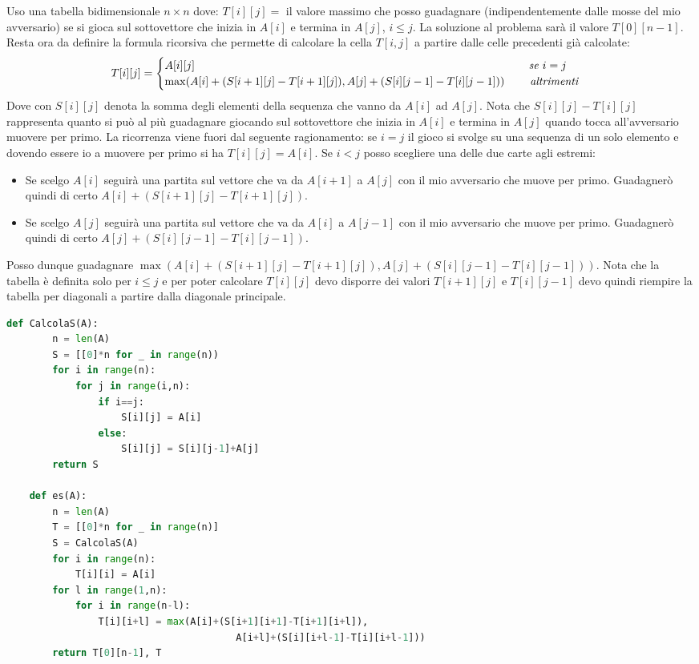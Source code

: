 Uso una tabella bidimensionale $n\times n$ dove: $T[i][j] =$ il valore massimo che posso guadagnare (indipendentemente dalle mosse del mio avversario) se si gioca sul sottovettore che inizia in $A[i]$ e termina in $A[j]$, $i\leq j$. La soluzione al problema sarà il valore $T[0][n-1]$. Resta ora da definire la formula ricorsiva che permette di calcolare la cella $T[i, j]$ a partire dalle celle precedenti già calcolate:
\begin{equation*}T[i][j]=
\begin{cases}
    A[i][j]\hspace{10.5cm}\textit{se }i=j\\
    \max(A[i]+(S[i+1][j]-T[i+1][j]), A[j]+(S[i][j-1]-T[i][j-1]))\hspace{.8cm}\textit{altrimenti}
\end{cases}
\end{equation*}
Dove con $S[i][j]$ denota la somma degli elementi della sequenza che vanno da $A[i]$ ad $A[j]$. Nota che $S[i][j]-T[i][j]$ rappresenta quanto si può al più guadagnare giocando sul sottovettore che inizia in $A[i]$ e termina in $A[j]$ quando tocca all'avversario muovere per primo. La ricorrenza viene fuori dal seguente ragionamento: se $i=j$ il gioco si svolge su una sequenza di un solo elemento e dovendo essere io a muovere per primo si ha $T[i][j]=A[i]$. Se $i < j$ posso scegliere una delle due carte agli estremi:
\begin{itemize}
    \item Se scelgo $A[i]$ seguirà una partita sul vettore che va da $A[i + 1]$ a $A[j]$ con il mio avversario che muove per primo. Guadagnerò quindi di certo $A[i]+(S[i + 1][j] - T[i + 1][j])$. 
    \item Se scelgo $A[j]$ seguirà una partita sul vettore che va da $A[i]$ a $A[j - 1]$ con il mio avversario che muove per primo. Guadagnerò quindi di certo $A[j]+(S[i][j - 1] - T[i][j - 1])$.
\end{itemize}
Posso dunque guadagnare $\max(A[i]+(S[i+1][j]-T[i+1][j]), A[j]+(S[i][j-1]-T[i][j-1]))$. Nota che la tabella è definita solo per $i \leq j$ e per poter calcolare $T[i][j]$ devo disporre dei valori $T[i + 1][j]$ e $T[i][j - 1]$ devo quindi riempire la tabella per diagonali a partire dalla diagonale principale.

\begin{lstlisting}[language=Python]
    def CalcolaS(A):
        n = len(A)
        S = [[0]*n for _ in range(n))
        for i in range(n):
            for j in range(i,n):
                if i==j:
                    S[i][j] = A[i]
                else:
                    S[i][j] = S[i][j-1]+A[j]
        return S

    def es(A):
        n = len(A)
        T = [[0]*n for _ in range(n)]
        S = CalcolaS(A)
        for i in range(n):
            T[i][i] = A[i]
        for l in range(1,n):
            for i in range(n-l):
                T[i][i+l] = max(A[i]+(S[i+1][i+1]-T[i+1][i+l]), 
                                        A[i+l]+(S[i][i+l-1]-T[i][i+l-1]))
        return T[0][n-1], T
\end{lstlisting}